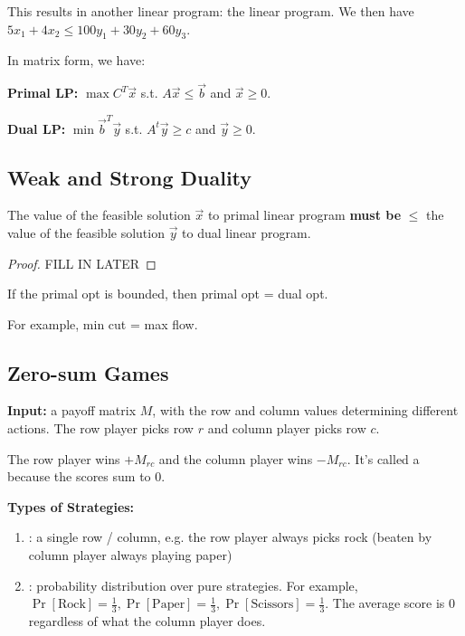 \documentclass{article}
\begin{document}
This results in another linear program: the  linear program. We then have $5x_1 + 4x_2 \leq 100y_1 + 30y_2 + 60y_3$.

In matrix form, we have:

\textbf{Primal LP:}
$\max C^T \vec{x}$ s.t. $A \vec x \leq \vec b$ and $\vec x \geq 0$.

\textbf{Dual LP:}
$\min \vec b^T \vec y$ s.t. $A^t \vec y \geq c$ and $\vec y \geq 0$.

\subsection{Weak and Strong Duality}

\begin{theorem}
    The value of the feasible solution $\vec x$ to primal linear program \textbf{must be} $\leq$ the value of the feasible solution $\vec y$ to dual linear program.
\end{theorem}

\begin{proof}
    FILL IN LATER
\end{proof}

\begin{theorem}
    If the primal opt is bounded, then primal opt = dual opt.
\end{theorem}

For example, min cut = max flow.

\subsection{Zero-sum Games}

\textbf{Input:} a payoff matrix $M$, with the row and column values determining different actions. The row player picks row $r$ and column player picks row $c$. 

The row player wins $+M_{rc}$ and the column player wins $-M_{rc}$. It's called a  because the scores sum to $0$.

\textbf{Types of Strategies:}
\begin{enumerate}
    \item {}: a single row / column, e.g. the row player always picks rock (beaten by column player always playing paper)
    \item {}: probability distribution over pure strategies. For example, $\Pr[\mathrm{Rock}] = \frac{1}{3}, \Pr[\mathrm{Paper}] = \frac{1}{3}, \Pr[\mathrm{Scissors}] = \frac{1}{3}$. The average score is $0$ regardless of what the column player does.
\end{enumerate}
\end{document}
